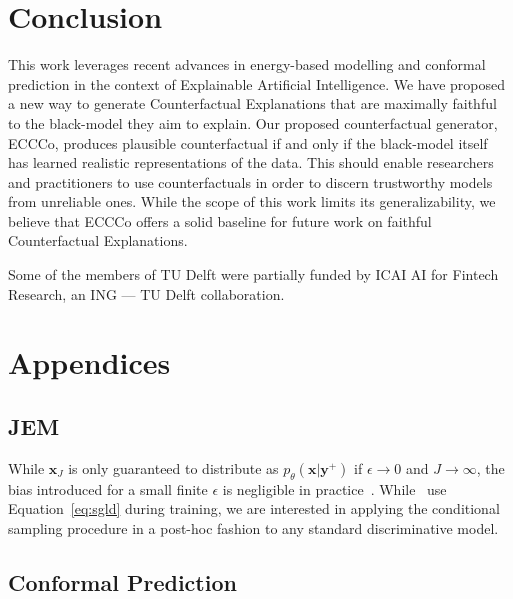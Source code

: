 \documentclass{article}
\begin{document}
\section{Conclusion}

This work leverages recent advances in energy-based modelling and conformal prediction in the context of Explainable Artificial Intelligence. We have proposed a new way to generate Counterfactual Explanations that are maximally faithful to the black-model they aim to explain. Our proposed counterfactual generator, ECCCo, produces plausible counterfactual if and only if the black-model itself has learned realistic representations of the data. This should enable researchers and practitioners to use counterfactuals in order to discern trustworthy models from unreliable ones. While the scope of this work limits its generalizability, we believe that ECCCo offers a solid baseline for future work on faithful Counterfactual Explanations.

\begin{ack}

Some of the members of TU Delft were partially funded by ICAI AI for Fintech Research, an ING — TU Delft
collaboration.

\end{ack}

\medskip



\appendix
\section*{Appendices}
\renewcommand{\thesubsection}{\Alph{subsection}}

\subsection{JEM}\label{app-jem}

While $\mathbf{x}_J$ is only guaranteed to distribute as $p_{\theta}(\mathbf{x}|\mathbf{y}^+)$ if $\epsilon \rightarrow 0$ and $J \rightarrow \infty$, the bias introduced for a small finite $\epsilon$ is negligible in practice~\citep{murphy2023probabilistic,grathwohl2020your}. While~\citet{grathwohl2020your} use Equation~\ref{eq:sgld} during training, we are interested in applying the conditional sampling procedure in a post-hoc fashion to any standard discriminative model. 

\subsection{Conformal Prediction}\label{app-cp}
\end{document}
